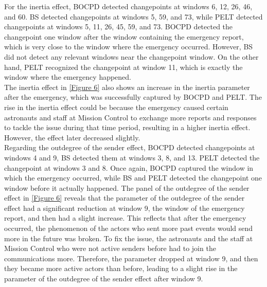 \documentclass[]{interact}
\theoremstyle{plain}%
\theoremstyle{definition}
\theoremstyle{remark}
\begin{document}
{	For the inertia effect, BOCPD detected changepoints at windows 6, 12, 26, 46, and 60. BS detected changepoints at windows 5, 59, and 73, while PELT detected changepoints at windows 5, 11, 26, 45, 59, and 73. BOCPD detected the changepoint one window after the window containing the emergency report, which is very close to the window where the emergency occurred. However, BS did not detect any relevant windows near the changepoint window. On the other hand, PELT recognized the changepoint at window 11, which is exactly the window where the emergency happened. \\
	 
	The inertia effect in \autoref{Figure 6} also shows an increase in the inertia parameter after the emergency, which was successfully captured by BOCPD and PELT. The rise in the inertia effect could be because the emergency caused certain astronauts and staff at Mission Control to exchange more reports and responses to tackle the issue during that time period, resulting in a higher inertia effect. However, the effect later decreased slightly. \\ 
	
    
	
	 
	Regarding the outdegree of the sender effect, BOCPD detected changepoints at windows 4 and 9, BS detected them at windows 3, 8, and 13. PELT detected the changepoint at windows 3 and 8. Once again, BOCPD captured the window in which the emergency occurred, while BS and PELT detected the changepoint one window before it actually happened. The panel of the outdegree of the sender effect in \autoref{Figure 6} reveals that the parameter of the outdegree of the sender effect had a significant reduction at window 9, the window of the emergency report, and then had a slight increase. This reflects that after the emergency occurred, the phenomenon of the actors who sent more past events would send more in the future was broken. To fix the issue, the astronauts and the staff at Mission Control who were not active senders before had to join the communications more. Therefore, the parameter dropped at window 9, and then they became more active actors than before, leading to a slight rise in the parameter of the outdegree of the sender effect after window 9. \\
	  
}
\end{document}
